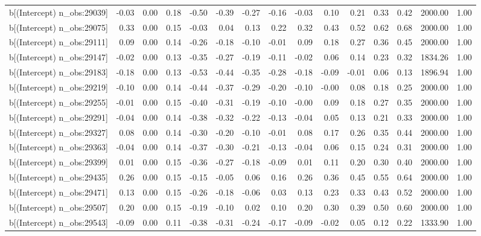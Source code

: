 \begin{table}[ht]
\begin{tabular}{rrrrrrrrrrrrrrr}
  b[(Intercept) n\_obs:29039] & -0.03 & 0.00 & 0.18 & -0.50 & -0.39 & -0.27 & -0.16 & -0.03 & 0.10 & 0.21 & 0.33 & 0.42 & 2000.00 & 1.00 \\ 
  b[(Intercept) n\_obs:29075] & 0.33 & 0.00 & 0.15 & -0.03 & 0.04 & 0.13 & 0.22 & 0.32 & 0.43 & 0.52 & 0.62 & 0.68 & 2000.00 & 1.00 \\ 
  b[(Intercept) n\_obs:29111] & 0.09 & 0.00 & 0.14 & -0.26 & -0.18 & -0.10 & -0.01 & 0.09 & 0.18 & 0.27 & 0.36 & 0.45 & 2000.00 & 1.00 \\ 
  b[(Intercept) n\_obs:29147] & -0.02 & 0.00 & 0.13 & -0.35 & -0.27 & -0.19 & -0.11 & -0.02 & 0.06 & 0.14 & 0.23 & 0.32 & 1834.26 & 1.00 \\ 
  b[(Intercept) n\_obs:29183] & -0.18 & 0.00 & 0.13 & -0.53 & -0.44 & -0.35 & -0.28 & -0.18 & -0.09 & -0.01 & 0.06 & 0.13 & 1896.94 & 1.00 \\ 
  b[(Intercept) n\_obs:29219] & -0.10 & 0.00 & 0.14 & -0.44 & -0.37 & -0.29 & -0.20 & -0.10 & -0.00 & 0.08 & 0.18 & 0.25 & 2000.00 & 1.00 \\ 
  b[(Intercept) n\_obs:29255] & -0.01 & 0.00 & 0.15 & -0.40 & -0.31 & -0.19 & -0.10 & -0.00 & 0.09 & 0.18 & 0.27 & 0.35 & 2000.00 & 1.00 \\ 
  b[(Intercept) n\_obs:29291] & -0.04 & 0.00 & 0.14 & -0.38 & -0.32 & -0.22 & -0.13 & -0.04 & 0.05 & 0.13 & 0.21 & 0.33 & 2000.00 & 1.00 \\ 
  b[(Intercept) n\_obs:29327] & 0.08 & 0.00 & 0.14 & -0.30 & -0.20 & -0.10 & -0.01 & 0.08 & 0.17 & 0.26 & 0.35 & 0.44 & 2000.00 & 1.00 \\ 
  b[(Intercept) n\_obs:29363] & -0.04 & 0.00 & 0.14 & -0.37 & -0.30 & -0.21 & -0.13 & -0.04 & 0.06 & 0.15 & 0.24 & 0.31 & 2000.00 & 1.00 \\ 
  b[(Intercept) n\_obs:29399] & 0.01 & 0.00 & 0.15 & -0.36 & -0.27 & -0.18 & -0.09 & 0.01 & 0.11 & 0.20 & 0.30 & 0.40 & 2000.00 & 1.00 \\ 
  b[(Intercept) n\_obs:29435] & 0.26 & 0.00 & 0.15 & -0.15 & -0.05 & 0.06 & 0.16 & 0.26 & 0.36 & 0.45 & 0.55 & 0.64 & 2000.00 & 1.00 \\ 
  b[(Intercept) n\_obs:29471] & 0.13 & 0.00 & 0.15 & -0.26 & -0.18 & -0.06 & 0.03 & 0.13 & 0.23 & 0.33 & 0.43 & 0.52 & 2000.00 & 1.00 \\ 
  b[(Intercept) n\_obs:29507] & 0.20 & 0.00 & 0.15 & -0.19 & -0.10 & 0.02 & 0.10 & 0.20 & 0.30 & 0.39 & 0.50 & 0.60 & 2000.00 & 1.00 \\ 
  b[(Intercept) n\_obs:29543] & -0.09 & 0.00 & 0.11 & -0.38 & -0.31 & -0.24 & -0.17 & -0.09 & -0.02 & 0.05 & 0.12 & 0.22 & 1333.90 & 1.00 \\ 

\end{tabular}
\end{table}
